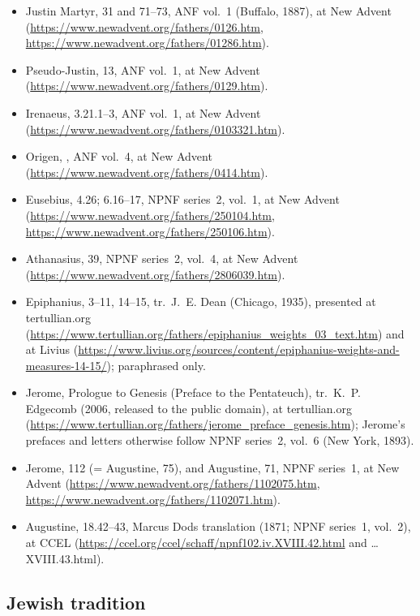 \begin{itemize}
\item Justin Martyr,  31 and  71--73, ANF vol.~1 (Buffalo, 1887), at New Advent
(\url{https://www.newadvent.org/fathers/0126.htm},
\url{https://www.newadvent.org/fathers/01286.htm}).
\item Pseudo-Justin,  13, ANF
vol.~1, at New Advent (\url{https://www.newadvent.org/fathers/0129.htm}).
\item Irenaeus,  3.21.1--3, ANF vol.~1, at New
Advent (\url{https://www.newadvent.org/fathers/0103321.htm}).
\item Origen, , ANF vol.~4, at New Advent
(\url{https://www.newadvent.org/fathers/0414.htm}).
\item Eusebius,  4.26; 6.16--17, NPNF series~2,
vol.~1, at New Advent (\url{https://www.newadvent.org/fathers/250104.htm},
\url{https://www.newadvent.org/fathers/250106.htm}).
\item Athanasius,  39, NPNF series~2, vol.~4, at New
Advent (\url{https://www.newadvent.org/fathers/2806039.htm}).
\item Epiphanius,  3--11, 14--15, tr.\
J.~E. Dean (Chicago, 1935), presented at tertullian.org
(\url{https://www.tertullian.org/fathers/epiphanius_weights_03_text.htm})
and at Livius
(\url{https://www.livius.org/sources/content/epiphanius-weights-and-measures-14-15/});
paraphrased only.
\item Jerome, Prologue to Genesis (Preface to the Pentateuch), tr.\
K.~P. Edgecomb (2006, released to the public domain), at tertullian.org
(\url{https://www.tertullian.org/fathers/jerome_preface_genesis.htm});
Jerome's prefaces and letters otherwise follow NPNF series~2, vol.~6
(New York, 1893).
\item Jerome,  112 (= Augustine, \work{Letters} 75), and
Augustine, \work{Letter} 71, NPNF series~1, at New Advent
(\url{https://www.newadvent.org/fathers/1102075.htm},
\url{https://www.newadvent.org/fathers/1102071.htm}).
\item Augustine, \work{City of God} 18.42--43, Marcus Dods translation
(1871; NPNF series~1, vol.~2), at CCEL
(\url{https://ccel.org/ccel/schaff/npnf102.iv.XVIII.42.html} and
\ldots XVIII.43.html).
\end{itemize}

\subsection*{Jewish tradition}

